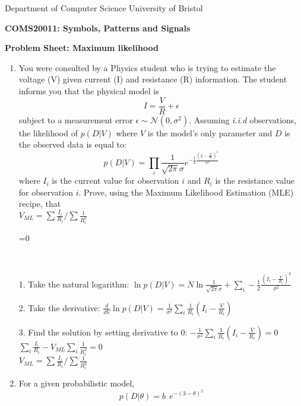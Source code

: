 \documentclass [11pt]{article}
\def\answers{0}
\newcommand{\answer}[1]{\ifnum\answers=0{\color{red}{\bf Answer:}\\\it{#1}}\fi}
\begin{document}
Department of Computer Science \hfill University of Bristol

\begin{center}
{\large\bf COMS20011: Symbols, Patterns and Signals}
\vspace{2ex}

{\large\bf Problem Sheet: Maximum likelihood}
\end{center}
\vspace{1ex}

\begin{enumerate}

\item You were consulted by a Physics student who is trying to estimate the voltage (V) given current (I) and resistance (R) information. The student informs you that the physical model is
\begin{equation*}
I = \frac{V}{R} + \epsilon
\end{equation*}
subject to a measurement error $\epsilon \sim \mathcal{N}(0, \sigma^2)$.
Assuming \textit{i.i.d} observations, the likelihood of $p(D | V)$ where $V$ is the model's only parameter and $D$ is the observed data is equal to:
\begin{equation*}
p(D|V) = \prod_i {\frac{1}{\sqrt{2 \pi} \sigma} e^{-\frac{1}{2}\frac{(I_i-\frac{V}{R_i})^2}{\sigma^2}}}
\end{equation*}
where $I_i$ is the current value for observation $i$ and $R_i$ is the resistance value for observation $i$. Prove, using the Maximum Likelihood Estimation (MLE) recipe, that\\
$V_{ML} = \sum \frac{I_i}{R_i}/{\sum{\frac{1}{R_i^2}}} $  

\answer{
1. Take the natural logarithm: 
$\ln p(D|V) = N \ln \frac{1}{\sqrt{2 \pi} \sigma} + \sum_i -\frac{1}{2} \frac{(I_i - \frac{V}{R_i})^2}{\sigma^2}$

2. Take the derivative: 
$\frac{d}{dV} \ln p(D|V) = \frac{1}{\sigma^2} \sum_i \frac{1}{R_i} (I_i - \frac{V}{R_i})$

3. Find the solution by setting derivative to 0:
$-\frac{1}{\sigma^2} \sum_i \frac{1}{R_i} (I_i - \frac{V}{R_i}) = 0$\\
$\sum_i\frac{I_i}{R_i} - V_{ML}\sum_i{\frac{1}{R_i^2}} = 0$\\
$V_{ML} = \sum \frac{I_i}{R_i}/{\sum{\frac{1}{R_i^2}}}$
}



\item For a given probabilistic model,
\begin{equation*}
p(D | \theta) = b \ \ e^{-(3-\theta)^2}
\end{equation*}


\end{enumerate}
\end{document}
